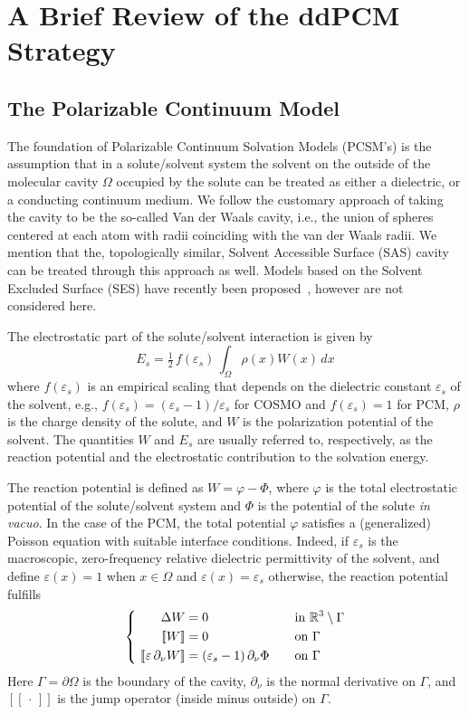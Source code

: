 \section{A Brief Review of the ddPCM Strategy}\label{sec:review}

\subsection{The Polarizable Continuum Model}
The foundation of Polarizable Continuum Solvation Models (PCSM's) is the assumption that in a solute/solvent system the solvent on the outside of the molecular cavity $\Omega$ occupied by the solute can be treated as either a dielectric, or a conducting continuum medium. We follow the customary approach of taking the cavity to be the so-called Van der Waals cavity\cite{ReviewPCM_2005}, i.e., the union of spheres centered at each atom with radii coinciding with the van der Waals radii. We mention that the, topologically similar, Solvent Accessible Surface (SAS) cavity can be treated through this approach as well.
Models based on the Solvent Excluded Surface (SES) have recently been proposed~\cite{Harbrecht2011,quan2017polarizable,C5CP03410H,JCC:JCC21431}, however are not considered here.

The electrostatic part of the solute/solvent interaction is given by
\[
E_s = \tfrac{1}{2}\, f(\varepsilon_s)\,\int_\Omega \rho(x) W(x) \, dx
\]
where $f(\varepsilon_s)$ is an empirical scaling that depends on the dielectric constant $\varepsilon_s$ of the solvent, e.g., $f(\varepsilon_s) = (\varepsilon_s - 1)/\varepsilon_s$ for COSMO and $f(\varepsilon_s) = 1$ for PCM, $\rho$ is the charge density of the solute, and $W$ is the polarization potential of the solvent. The quantities $W$ and $E_s$ are usually referred to, respectively, as the reaction potential and the electrostatic contribution to the solvation energy. 

The reaction potential is defined as $W = \varphi - \Phi$, where $\varphi$ is the total electrostatic potential of the solute/solvent system and $\Phi$ is the potential of the solute \emph{in vacuo}. In the case of the PCM, the total potential $\varphi$ satisfies a (generalized) Poisson equation with suitable interface conditions\cite{Mennucci_JCP_IEF1,Mennucci_JMC_IEF2}. Indeed, if $\varepsilon_s$ is the macroscopic, zero-frequency relative dielectric permittivity of the solvent, and define $\varepsilon(x) = 1$ when $x \in \Omega$ and $\varepsilon(x) = \varepsilon_s$ otherwise, the reaction potential fulfills 
\begin{equation} 
\label{eq:pcmpde}
\left \{ 
\begin{alignedat}{4}
\Delta  W &= 0  &&\mbox{in } \mathbb{R}^3\setminus \Gamma  \\
 \ [\![W]\!] &= 0  &&\mbox{on } \Gamma\\
\  [\![\varepsilon \, \partial_\nu W]\!] &= (\varepsilon_s-1)\, \partial_\nu \Phi &\qquad& \mbox{on } \Gamma
\end{alignedat} 
\right.
\end{equation}
Here $\Gamma=\partial\Omega$ is the boundary of the cavity, $\partial_\nu$ is the normal derivative on $\Gamma$, and $[\![\,\cdot\,]\!]$ is the jump operator (inside minus outside) on $\Gamma$.

